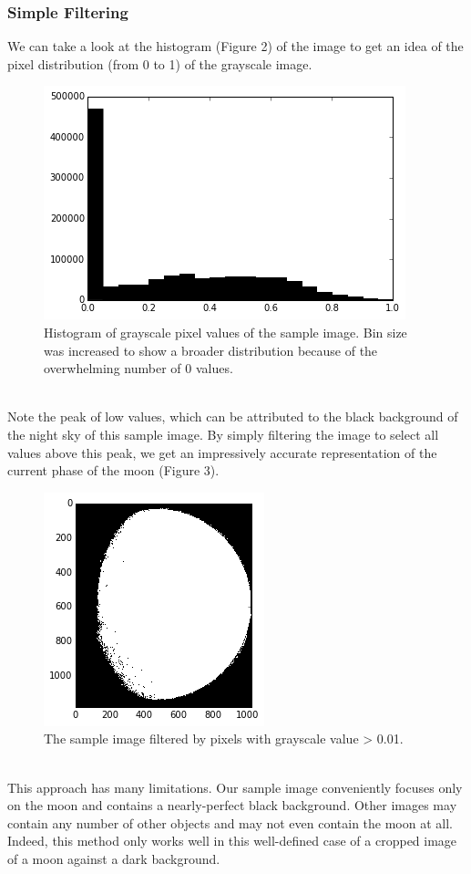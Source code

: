 \documentclass[]{article}
\begin{document}
\subsubsection*{Simple Filtering}
We can take a look at the histogram (Figure 2) of the image to get an idea of the pixel distribution (from 0 to 1) of the grayscale image.
\begin{figure}[h]
\centering
\includegraphics[scale=0.6]{hist}
\caption{Histogram of grayscale pixel values of the sample image. Bin size was increased  to show a broader distribution because of the overwhelming number of 0 values.}
\end{figure}
\pagebreak
\\
Note the peak of low values, which can be attributed to the black background of the night sky of this sample image. By simply filtering the image to select all values above this peak, we get an impressively accurate representation of the current phase of the moon (Figure 3).
\begin{figure}[h]
\centering
\includegraphics[scale=0.9]{moon_hist_filtered}
\caption{The sample image filtered by pixels with grayscale value > 0.01.}
\end{figure}
\\
This approach has many limitations. Our sample image conveniently focuses only on the moon and contains a nearly-perfect black background. Other images may contain any number of other objects and may not even contain the moon at all. Indeed, this method only works well in this well-defined case of a cropped image of a moon against a dark background.
\end{document}
